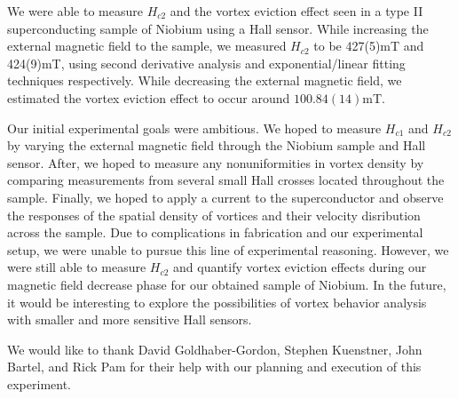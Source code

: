 \documentclass[twocolumn,aps,prl]{revtex4-1} %
\begin{document}
We were able to measure $H_{c2}$ and the vortex eviction effect seen in a type II superconducting sample of Niobium using a Hall sensor. While increasing the external magnetic field to the sample, we measured $H_{c2}$ to be 427(5)mT and 424(9)mT, using second derivative analysis and exponential/linear fitting techniques respectively. While decreasing the external magnetic field, we estimated the vortex eviction effect to occur around $100.84(14)$mT. 

Our initial experimental goals were ambitious. We hoped to measure $H_{c1}$ and $H_{c2}$ by varying the external magnetic field through the Niobium sample and Hall sensor. After, we hoped to measure any nonuniformities in vortex density by comparing measurements from several small Hall crosses located throughout the sample. Finally, we hoped to apply a current to the superconductor and observe the responses of the spatial density of vortices and their velocity disribution across the sample. Due to complications in fabrication and our experimental setup, we were unable to pursue this line of experimental reasoning. However, we were still able to measure $H_{c2}$ and quantify vortex eviction effects during our magnetic field decrease phase for our obtained sample of Niobium. In the future, it would be interesting to explore the possibilities of vortex behavior analysis with smaller and more sensitive Hall sensors.

We would like to thank David Goldhaber-Gordon, Stephen Kuenstner, John Bartel, and Rick Pam for their help with our planning and execution of this experiment.
\end{document}
